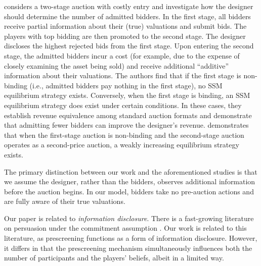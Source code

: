\citet{ye_2007_GEB_indicative_twostage_auctions} considers a two-stage auction with costly entry and investigate how the designer should determine the number of admitted bidders. In the first stage, all bidders receive partial information about their (true) valuations and submit bids. The players with top bidding are then promoted to the second stage.
The designer discloses the highest rejected bids from the first stage. Upon entering the second stage, the admitted bidders incur a cost (for example, due to the expense of closely examining the asset being sold) and receive additional ``additive'' information about their valuations. 
The authors find that if the first stage is non-binding (i.e., admitted bidders pay nothing in the first stage), no SSM equilibrium strategy exists. Conversely, when the first stage is binding, an SSM equilibrium strategy does exist under certain conditions. In these cases, they establish revenue equivalence among standard auction formats and demonstrate that admitting fewer bidders can improve the designer's revenue.
\citet{quint_2018_theory_indicativebidding} demonstrates that when the first-stage auction is non-binding and the second-stage auction operates as a second-price auction, a weakly increasing equilibrium strategy exists.



The primary distinction between our work and the aforementioned studies is that we assume the designer, rather than the bidders, observes additional information before the auction begins. In our model, bidders take no pre-auction actions and are fully aware of their true valuations.





Our paper is related to \textit{information disclosure}. There is a fast-growing literature on persuasion under the commitment assumption \citep{kamenica_2011_persuasion,kamenica_2019_bayesian_review,candogan_2020_info_operations,bergemann_2022_info_disclosure_auctions,sun_2024_lead_selling}. 
Our work is related to this literature, as prescreening functions as a form of information disclosure. However, it differs in that the prescreening mechanism simultaneously influences both the number of participants and the players' beliefs, albeit in a limited way.



